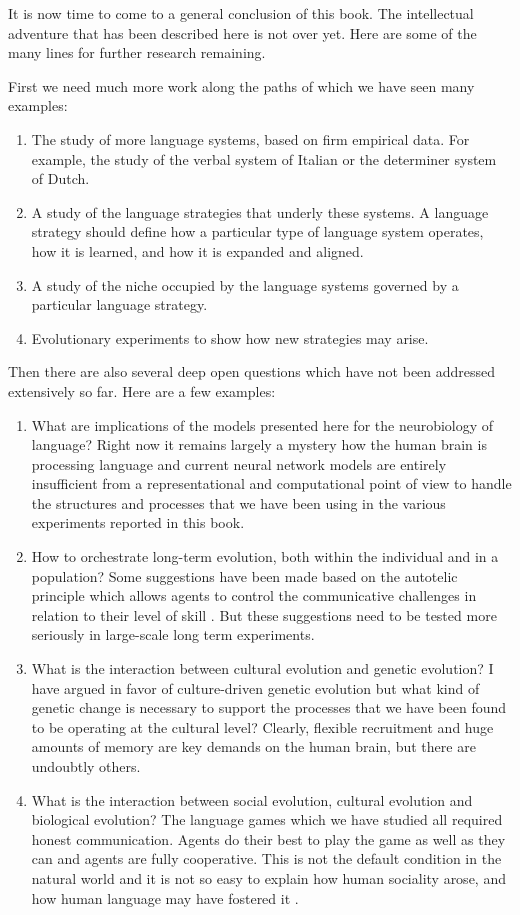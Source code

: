 It is now time to come to a general conclusion of this book. The intellectual adventure that has been described here 
is not over yet.  Here are some of the many lines for further research remaining. 

First we need much more work along the paths of which we have seen many examples: 
\begin{enumerate}
\item The study of more language systems, based on firm empirical data. For example, the study of the verbal system of 
Italian or the determiner system of Dutch. 
\item A study of the language strategies that underly these systems. A language strategy should define how a particular 
type of language system operates, how it is learned, and how it is expanded and aligned. 
\item A study of the niche occupied by the language systems governed by a particular language strategy. 
\item Evolutionary experiments to show how new strategies may arise. 
\end{enumerate} 
Then there are also several deep open questions which have not been addressed extensively so far. Here are a few examples: 
\begin{enumerate}
\item What are implications of the models presented here for the neurobiology of language? Right now it remains largely 
a mystery how the human brain is processing language and current neural network models are entirely insufficient from 
a representational and computational point of view to handle the structures and processes that we have been using in 
the various experiments reported in this book. 
\item How to orchestrate long-term evolution, both within the individual and in a population? Some suggestions have been 
made based on the autotelic principle which allows agents to control the communicative challenges in 
relation to their level of skill \citep{Steels:2007}. 
But these suggestions need to be tested
more seriously in large-scale long term experiments. 
\item What is the interaction between cultural evolution and genetic evolution? I have argued in favor of culture-driven genetic
evolution but what kind of genetic change is necessary to support the processes that we have been found to 
be operating at the cultural level? Clearly, flexible recruitment and huge amounts of memory are key demands on the 
human brain, but there are undoubtly others. 
\item What is the interaction between social evolution, cultural evolution and biological evolution? The language 
games which we have studied all required honest communication. Agents do their best to play the game as well as they 
can and agents are fully cooperative. This is not the default condition in the natural world and it is not so easy 
to explain how human sociality arose, and how human language may have fostered it \citep{Dor:2014}. 
\end{enumerate}
